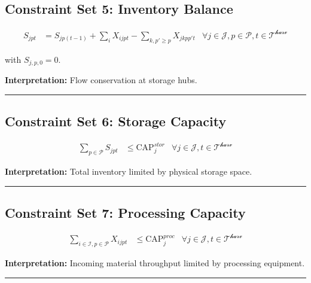 \documentclass[
  11pt,
  11pt,
  a4paper]{article}
\begin{document}
\subsection{Constraint Set 5: Inventory
Balance}\label{constraint-set-5-inventory-balance}

\begin{align}
S_{jpt} &= S_{jp(t-1)} + \sum_{i} X_{ijpt} - \sum_{k, p' \geq p} X_{jkpp't} & \forall j \in \mathcal{J}, p \in \mathcal{P}, t \in \mathcal{T^{harv}} \tag{C5}
\end{align}

with \(S_{j,p,0} = 0\).

\textbf{Interpretation:} Flow conservation at storage hubs.

\begin{center}\rule{0.5\linewidth}{0.5pt}\end{center}

\subsection{Constraint Set 6: Storage
Capacity}\label{constraint-set-6-storage-capacity}

\begin{align}
\sum_{p \in \mathcal{P}} S_{jpt} &\leq \text{CAP}^{stor}_j & \forall j \in\mathcal{J}, t \in \mathcal{T^{harv}} \tag{C6}
\end{align}

\textbf{Interpretation:} Total inventory limited by physical storage
space.

\begin{center}\rule{0.5\linewidth}{0.5pt}\end{center}

\subsection{Constraint Set 7: Processing
Capacity}\label{constraint-set-7-processing-capacity}

\begin{align}
\sum_{i \in \mathcal{I}, p \in \mathcal{P}} X_{ijpt} &\leq \text{CAP}^{proc}_j & \forall j \in \mathcal{J}, t \in \mathcal{T^{harv}} \tag{C7}
\end{align}

\textbf{Interpretation:} Incoming material throughput limited by
processing equipment.

\begin{center}\rule{0.5\linewidth}{0.5pt}\end{center}
\end{document}
